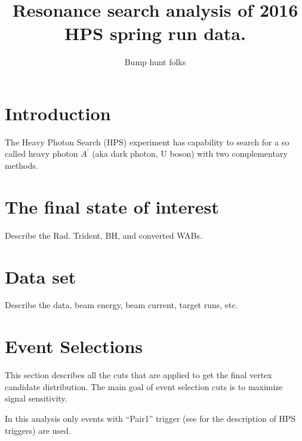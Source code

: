 \documentclass[letterpaper,12pt]{article}
\author{Bump hunt folks}
\title{Resonance search analysis of 2016 HPS spring run data.}
\def \Ap {$A^{\prime}$ }
\begin{document}
\maketitle

\tableofcontents
\newpage

\section{Introduction}

The Heavy Photon Search (HPS) experiment has capability to search for a so called heavy photon \Ap (aka dark photon, U boson) with two complementary methods. 

\section{The final state of interest} \label{sec:FinalState}
Describe the Rad. Trident, BH, and converted WABs.


\section{Data set}
Describe the data, beam energy, beam current, target runs, etc.

\section{Event Selections}
This section describes all the cuts that are applied to get the final vertex candidate distribution. 
The main goal of event selection cuts is to maximize signal sensitivity.

In this analysis only events with ``Pair1'' trigger (see \cite{TriggerNote} for the description of HPS triggers) are used.
\end{document}
